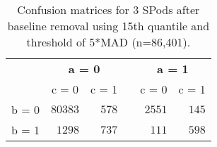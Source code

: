 \begin{table}[!tbp]
\caption{Confusion matrices for 3 SPods after baseline 
      removal using 15th quantile and threshold of 5*MAD (n=86,401).\label{conf}} 
\begin{center}
\begin{tabular}{lrrcrr}
\hline\hline
\multicolumn{1}{l}{\bfseries }&\multicolumn{2}{c}{\bfseries a = 0}&\multicolumn{1}{c}{\bfseries }&\multicolumn{2}{c}{\bfseries a = 1}\tabularnewline
\cline{2-3} \cline{5-6}
\multicolumn{1}{l}{}&\multicolumn{1}{c}{c = 0}&\multicolumn{1}{c}{c = 1}&\multicolumn{1}{c}{}&\multicolumn{1}{c}{c = 0}&\multicolumn{1}{c}{c = 1}\tabularnewline
\hline
b = 0&$80383$&$578$&&$2551$&$145$\tabularnewline
b = 1&$ 1298$&$737$&&$ 111$&$598$\tabularnewline
\hline
\end{tabular}\end{center}
\end{table}
